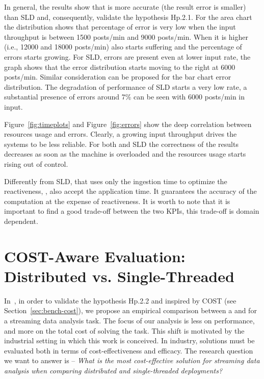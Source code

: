 {In general, the results show that \sti{} is more accurate (the result error is smaller) than SLD and, consequently, validate the hypothesis \textsf{Hp.2.1}. For the area chart the distribution shows that \sti{} percentage of error is very low when the input throughput is between 1500 posts/min and 9000 posts/min. When it is higher (i.e., 12000 and  18000 posts/min) also \sti{} starts suffering and the percentage of errors starts growing. For SLD, errors are present even at lower input rate, the graph shows that the error distribution starts moving to the right at 6000 posts/min. Similar consideration can be proposed for the bar chart error distribution. The degradation of performance of SLD starts a very low rate, a substantial presence of errors around 7\% can be seen with 6000 posts/min in input.

Figure~\ref{fig:timeplots} and Figure~\ref{fig:errors} show the deep correlation between resources usage and errors. Clearly, a growing input throughput drives the systems to be less reliable. For both \sti{} and SLD the correctness of the results decreases as soon as the machine is overloaded and the resources usage starts rising out of control.

{\color{red}
Differently from SLD, that uses only the ingestion time to optimize the reactiveness, \sti{}, also accept the application time. It guarantees the accuracy of the computation at the expense of reactiveness. 
It is worth to note that it is important to find a good trade-off between the two KPIs, this trade-off is domain dependent. 
}

\section{COST-Aware Evaluation: Distributed vs. Single-Threaded} \label{sec:comp-mod-eval-cost}
In~\cite{DBLP:conf/debs/BalduiniPV18}, in order to validate the hypothesis \textsf{Hp.2.2} and inspired by COST (see Section~\ref{sec:bench-cost}), we propose an empirical comparison between a \sparkdi{} and \sti{} for a streaming data analysis task. The focus of our analysis is less on performance, and more on the total cost of solving the task. This shift is motivated by the industrial setting in which this work is conceived. In industry, solutions must be evaluated both in terms of cost-effectiveness and efficacy. The research question we want to answer is -- \textit{What is the most cost-effective solution for streaming data analysis when comparing distributed and single-threaded deployments?}

}
